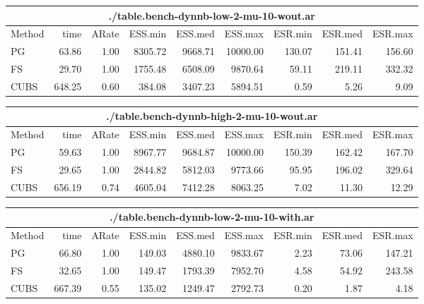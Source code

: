 \documentclass[11pt]{article}
\begin{document}
\newpage

\begin{table}
\begin{tabular}{l r r r r r r r r } 
\hline
\multicolumn{9}{c}{./table.bench-dynnb-low-2-mu-10-wout.ar} \\
\hline
          Method  &     time &    ARate &  ESS.min &  ESS.med &  ESS.max &  ESR.min &  ESR.med &  ESR.max \\ 
              PG  &    63.86 &     1.00 &  8305.72 &  9668.71 & 10000.00 &   130.07 &   151.41 &   156.60 \\ 
              FS  &    29.70 &     1.00 &  1755.48 &  6508.09 &  9870.64 &    59.11 &   219.11 &   332.32 \\ 
            CUBS  &   648.25 &     0.60 &   384.08 &  3407.23 &  5894.51 &     0.59 &     5.26 &     9.09
 \end{tabular}

\begin{tabular}{l r r r r r r r r } 
\hline
\multicolumn{9}{c}{./table.bench-dynnb-high-2-mu-10-wout.ar} \\
\hline
          Method  &     time &    ARate &  ESS.min &  ESS.med &  ESS.max &  ESR.min &  ESR.med &  ESR.max \\ 
              PG  &    59.63 &     1.00 &  8967.77 &  9684.87 & 10000.00 &   150.39 &   162.42 &   167.70 \\ 
              FS  &    29.65 &     1.00 &  2844.82 &  5812.03 &  9773.66 &    95.95 &   196.02 &   329.64 \\ 
            CUBS  &   656.19 &     0.74 &  4605.04 &  7412.28 &  8063.25 &     7.02 &    11.30 &    12.29
 \end{tabular}

\begin{tabular}{l r r r r r r r r } 
\hline
\multicolumn{9}{c}{./table.bench-dynnb-low-2-mu-10-with.ar} \\
\hline
          Method  &     time &    ARate &  ESS.min &  ESS.med &  ESS.max &  ESR.min &  ESR.med &  ESR.max \\ 
              PG  &    66.80 &     1.00 &   149.03 &  4880.10 &  9833.67 &     2.23 &    73.06 &   147.21 \\ 
              FS  &    32.65 &     1.00 &   149.47 &  1793.39 &  7952.70 &     4.58 &    54.92 &   243.58 \\ 
            CUBS  &   667.39 &     0.55 &   135.02 &  1249.47 &  2792.73 &     0.20 &     1.87 &     4.18
 \end{tabular}


\end{table}
\end{document}
